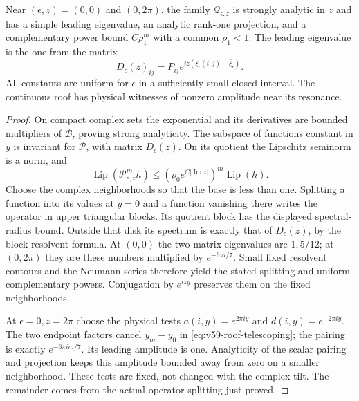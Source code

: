\begin{lemma}
\label{lem:v59-markov-spectrum}
Near $(\epsilon,z)=(0,0)$ and $(0,2\pi)$, the family
$\mathcal Q_{\epsilon,z}$ is strongly analytic in $z$ and has a simple
leading eigenvalue, an analytic rank-one projection, and a complementary
power bound $C\rho_1^m$ with a common $\rho_1<1$. The leading eigenvalue
is the one from the matrix
\begin{equation}\label{eq:v59-markov-matrix}
 D_\epsilon(z)_{ij}
       =P_{ij}e^{iz(\xi_\epsilon(i,j)-\bar\xi_\epsilon)}.
\end{equation}
All constants are uniform for $\epsilon$ in a sufficiently small closed
interval. The continuous roof has physical witnesses of nonzero
amplitude near its resonance.
\end{lemma}
\begin{proof}
On compact complex sets the exponential and its derivatives are bounded
multipliers of $\mathcal B$, proving strong analyticity. The subspace
of functions constant in $y$ is invariant for $\mathcal P$, with matrix
$D_\epsilon(z)$. On its quotient the Lipschitz seminorm is a norm, and
\[
 \operatorname{Lip}(\mathcal P_{\epsilon,z}^mh)
 \le(\rho_0e^{C|\operatorname{Im}z|})^m\operatorname{Lip}(h).
\]
Choose the complex neighborhoods so that the base is less than one.
Splitting a function into its values at $y=0$ and a function vanishing
there writes the operator in upper triangular blocks. Its quotient
block has the displayed spectral-radius bound. Outside that disk its
spectrum is exactly that of $D_\epsilon(z)$, by the block resolvent
formula. At $(0,0)$ the two matrix eigenvalues are $1,5/12$; at
$(0,2\pi)$ they are these numbers multiplied by $e^{-6\pi i/7}$.
Small fixed resolvent contours and the Neumann series therefore yield
the stated splitting and uniform complementary powers. Conjugation by
$e^{izy}$ preserves them on the fixed neighborhoods.

At $\epsilon=0,z=2\pi$ choose the physical tests
$a(i,y)=e^{2\pi iy}$ and $d(i,y)=e^{-2\pi iy}$. The two endpoint
factors cancel $y_m-y_0$ in \eqref{eq:v59-roof-telescoping}; the
pairing is exactly $e^{-6\pi im/7}$. Its leading amplitude is one.
Analyticity of the scalar pairing and projection keeps this amplitude
bounded away from zero on a smaller neighborhood. These tests are
fixed, not changed with the complex tilt. The remainder comes from
the actual operator splitting just proved.
\end{proof}

